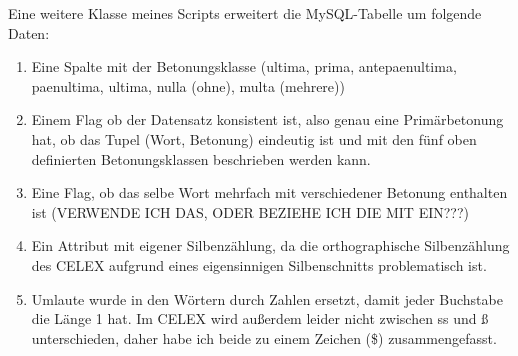Eine weitere Klasse meines Scripts erweitert die MySQL-Tabelle um folgende Daten:
\begin{enumerate}
\item Eine Spalte mit der Betonungsklasse (ultima, prima, antepaenultima, paenultima, ultima, nulla (ohne), multa (mehrere))
\item Einem Flag ob der Datensatz konsistent ist, also genau eine Primärbetonung hat, ob das Tupel (Wort, Betonung) eindeutig ist und mit den fünf oben definierten Betonungsklassen beschrieben werden kann.
\item Eine Flag, ob das selbe Wort mehrfach mit verschiedener Betonung enthalten ist (VERWENDE ICH DAS, ODER BEZIEHE ICH DIE MIT EIN???)
\item Ein Attribut mit eigener Silbenzählung, da die orthographische Silbenzählung des CELEX aufgrund eines eigensinnigen Silbenschnitts problematisch ist. 
\item Umlaute wurde in den Wörtern durch Zahlen ersetzt, damit jeder Buchstabe die Länge 1 hat. Im CELEX wird außerdem leider nicht zwischen ss und ß unterschieden, daher habe ich beide zu einem Zeichen ({\$}) zusammengefasst.
\end{enumerate}


